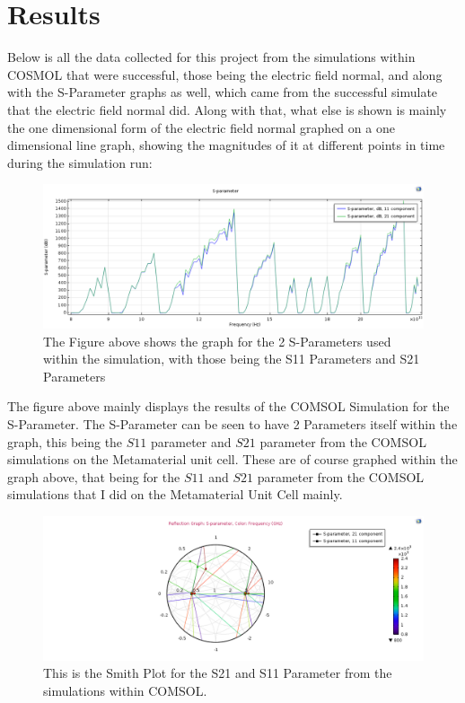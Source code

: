 \documentclass[]{article}
\begin{document}
\section*{Results}
Below is all the data collected for this project from the simulations within COSMOL that were successful, those being the electric field normal, and along with the S-Parameter graphs as well, which came from the successful simulate that the electric field normal did. Along with that, what else is shown is mainly the one dimensional form of the electric field normal graphed on a one dimensional line graph, showing the magnitudes of it at different points in time during the simulation run:
\begin{figure}[H]
	\centering
	\includegraphics[width=\textwidth]{SParameterGraph1D.png}
	\caption{The Figure above shows the graph for the 2 S-Parameters used within the simulation, with those being the S11 Parameters and S21 Parameters}
	\label{test111}
\end{figure}
\noindent
The figure above mainly displays the results of the COMSOL Simulation for the S-Parameter. The S-Parameter can be seen to have 2 Parameters itself within the graph, this being the $S11$ parameter and $S21$ parameter from the COMSOL simulations on the Metamaterial unit cell. These are of course graphed within the graph above, that being for the $S11$ and $S21$ parameter from the COMSOL simulations that I did on the Metamaterial Unit Cell mainly.
\begin{figure}[H]
	\centering
	\includegraphics[width=\textwidth]{SmithPlotforReflection.png}
	\caption{This is the Smith Plot for the S21 and S11 Parameter from the simulations within COMSOL.}
	\label{test1112}
\end{figure}
\end{document}
